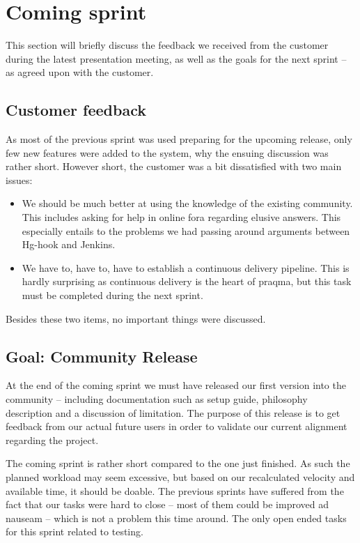 \documentclass[a4paper]{article}
\begin{document}
\section{Coming sprint}
This section will briefly discuss the feedback we received from the customer during
the latest presentation meeting, as well as the goals for the next sprint -- as 
agreed upon with the customer.

\subsection{Customer feedback}
As most of the previous sprint was used preparing for the upcoming release, only
few new features were added to the system, why the ensuing discussion was rather short.
However short, the customer was a bit dissatisfied with two main issues:
\begin{itemize}
	\item We should be much better at using the knowledge of the existing community.
		This includes asking for help in online fora regarding elusive answers.
		This especially entails to the problems we had passing around arguments
		between Hg-hook and Jenkins.
	\item We have to, have to, have to establish a continuous delivery pipeline.
		This is hardly surprising as continuous delivery is the heart of praqma,
		but this task must be completed during the next sprint.
\end{itemize}

Besides these two items, no important things were discussed.

\subsection{Goal: Community Release}
At the end of the coming sprint we must have released our first version into the
community -- including documentation such as setup guide, philosophy description
and a discussion of limitation. The purpose of this release is to get feedback
from our actual future users in order to validate our current alignment regarding
the project.

The coming sprint is rather short compared to the one just finished. As such the
planned workload may seem excessive, but based on our recalculated velocity and
available time, it should be doable. The previous sprints have suffered from the
fact that our tasks were hard to close -- most of them could be improved ad nauseam --
which is not a problem this time around. The only open ended tasks for this sprint
related to testing.
\end{document}
